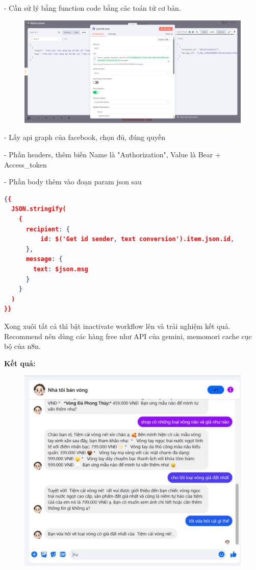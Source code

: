 \newpage

- Cần sử lý bằng function code bằng các toán tử cơ bản.

\begin{figure}[htbp]
    \centering
    \includegraphics[width=1\linewidth]{Chap1-7/send-fb.pdf}
\end{figure}

- Lấy api graph của facebook, chọn đủ, đúng quyền

- Phần headers, thêm biến Name là "Authorization", Value là Bear + Access\_token

- Phần body thêm vào đoạn param json sau

\begin{lstlisting}[language = Json]
{{ 
  JSON.stringify(
    {
      recipient: { 
          id: $('Get id sender, text conversion').item.json.id,
      },
      message: {
        text: $json.msg
      }
    }
  )
}}
\end{lstlisting}

Xong xuôi tất cả thì bật inactivate workflow lên và trải nghiệm kết quả. Recommend nên dùng các hàng free như API của gemini, memomori cache cục bộ của n8n. 

\textbf{Kết quả: }

\begin{figure}[htbp]
    \centering
    \includegraphics[width=1\linewidth]{Chap1-7/result-mess.pdf}
\end{figure}

